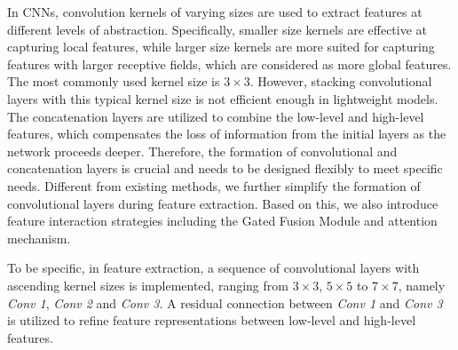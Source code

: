 \documentclass[lettersize,journal]{IEEEtran}
\begin{document}
In CNNs, convolution kernels of varying sizes are used to extract features at different levels of abstraction. Specifically, smaller size kernels are effective at capturing local features, while larger size kernels are more suited for capturing features with larger receptive fields, which are considered as more global features. The most commonly used kernel size is $3 \times 3$. %
However, stacking convolutional layers with this typical kernel size is not efficient enough in lightweight models. The concatenation layers are utilized to combine the low-level and high-level features, which compensates the loss of information from the initial layers as the network proceeds deeper. Therefore, the formation of convolutional and concatenation layers is crucial and needs to be designed flexibly to meet specific needs. Different from existing methods, we further simplify the formation of convolutional layers during feature extraction. Based on this, we also introduce feature interaction strategies including the Gated Fusion Module and attention mechanism.

To be specific, in feature extraction, a sequence of convolutional layers with ascending kernel sizes is implemented, ranging from $3 \times 3$, $5 \times 5$ to $7 \times 7$, namely \textit{Conv 1}, \textit{Conv 2} and \textit{Conv 3}. %
A residual connection between \textit{Conv 1} and \textit{Conv 3} is utilized to refine feature representations between low-level and high-level features.
\end{document}
